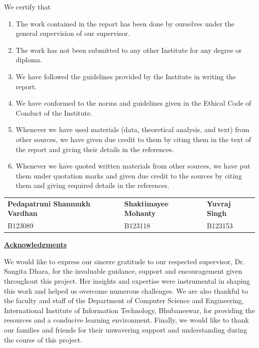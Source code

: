 \documentclass[10pt,openany]{report}
\begin{document}
\vspace{0.9cm}
\noindent
We certify that

\begin{enumerate}
  \item The work contained in the report has been done by ourselves under the general supervision
        of our supervisor.
  \item The work has not been submitted to any other Institute for any degree or diploma.
  \item We have followed the guidelines provided by the Institute in writing the report.
  \item We have conformed to the norms and guidelines given in the Ethical Code of Conduct of the
        Institute.
  \item Whenever we have used materials (data, theoretical analysis, and text) from other sources,
        we have given due credit to them by citing them in the text of the report and giving their
        details in the references.
  \item Whenever we have quoted written materials from other sources, we have put them under
        quotation marks and given due credit to the sources by citing them and giving required
        details in the references.
\end{enumerate}

\vspace{2.5cm}
\noindent
\noindent
\begin{tabular}{@{}p{5.75cm}p{4.35cm}p{4.35cm}@{}}
\textbf{Pedapatruni Shanmukh Vardhan} & \textbf{Shaktimayee Mohanty} & \textbf{Yuvraj Singh} \\[0.12em]
B123089 & B123118 & B123153 \\
\end{tabular}

\newpage
\thispagestyle{empty}
\noindent\underline{\textbf{Acknowledgments}}

\vspace{0.9cm}
\noindent
We would like to express our sincere gratitude to our respected supervisor, Dr. Sangita Dhara, for the
invaluable guidance, support and encouragement given throughout this project. Her insights and
expertise were instrumental in shaping this work and helped us overcome numerous challenges. We are
also thankful to the faculty and staff of the Department of Computer Science and Engineering,
International Institute of Information Technology, Bhubaneswar, for providing the resources and a
conducive learning environment. Finally, we would like to thank our families and friends for their
unwavering support and understanding during the course of this project.
\end{document}
